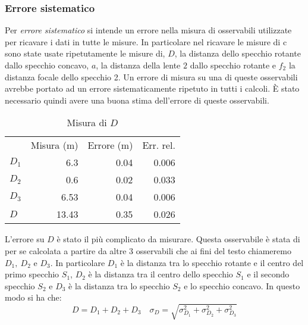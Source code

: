 \documentclass[a4paper,11pt]{article}
\begin{document}
	\subsubsection{Errore sistematico}
	Per \emph{errore sistematico} si intende un errore nella misura di osservabili utilizzate per ricavare i dati in tutte le misure. In particolare nel ricavare le misure di c sono state usate ripetutamente le misure di, $ D $, la distanza dello specchio rotante dallo specchio concavo, $ a $, la distanza della lente $ 2 $ dallo specchio rotante e $ f_2 $ la distanza focale dello specchio 2. Un errore di misura su una di queste osservabili avrebbe portato ad un errore sistematicamente ripetuto in tutti i calcoli. È stato necessario quindi avere una buona stima dell'errore di queste osservabili. \\
	\begin{wraptable}{r} {0.5 \textwidth}
		\centering
		\vspace{-1cm}
		\caption{Misura di $D$}
		\vspace{0.1 cm}
		\begin{tabular}{lrrr}
			\rowcolor[rgb]{ .741,  .843,  .933} \multicolumn{1}{r}{} & \multicolumn{1}{l}{Misura (\si{\meter})} & \multicolumn{1}{l}{Errore (\si{\meter})} & \multicolumn{1}{l}{Err. rel.} \\
			\rowcolor[rgb]{ .741,  .843,  .933} $ D_1 $    & \cellcolor[rgb]{ .859,  .859,  .859} 6.3 & \cellcolor[rgb]{ .859,  .859,  .859} 0.04 & \cellcolor[rgb]{ .859,  .859,  .859} 0.006 \\
			\rowcolor[rgb]{ .741,  .843,  .933} $ D_2 $    & \cellcolor[rgb]{ .929,  .929,  .929} 0.6 & \cellcolor[rgb]{ .929,  .929,  .929} 0.02 & \cellcolor[rgb]{ .929,  .929,  .929} 0.033 \\
			\rowcolor[rgb]{ .741,  .843,  .933} $ D_3 $    & \cellcolor[rgb]{ .859,  .859,  .859} 6.53 & \cellcolor[rgb]{ .859,  .859,  .859} 0.04 & \cellcolor[rgb]{ .859,  .859,  .859} 0.006 \\ 
			\rowcolor[rgb]{ .741,  .843,  .933} $ D $     & \cellcolor[rgb]{ .929,  .929,  .929} 13.43 & \cellcolor[rgb]{ .929,  .929,  .929} 0.35 & \cellcolor[rgb]{ .929,  .929,  .929} 0.026 \\
		\end{tabular}%
		\label{tab:D}
	\end{wraptable}%
	L'errore su $ D $ è stato il più complicato da misurare. Questa osservabile è stata di per se calcolata a partire da altre 3 osservabili che ai fini del testo chiameremo $ D_1,\ D_2 $ e $ D_3 $. In particolare $ D_1 $ è la distanza tra lo specchio rotante e il centro del primo specchio $ S_1 $, $ D_2 $ è la distanza tra il centro dello specchio $ S_1 $ e il secondo specchio $ S_2 $ e $ D_3 $ è la distanza tra lo specchio $ S_2 $ e lo specchio concavo. In questo modo si ha che:
	\begin{equation}\label{eqn:D}
		D = D_1 + D_2 + D_3 \quad \sigma_D = \sqrt{\sigma_{D_1}^2 + \sigma_{D_2}^2 + \sigma_{D_3}^2}
	\end{equation}
	
\end{document}
